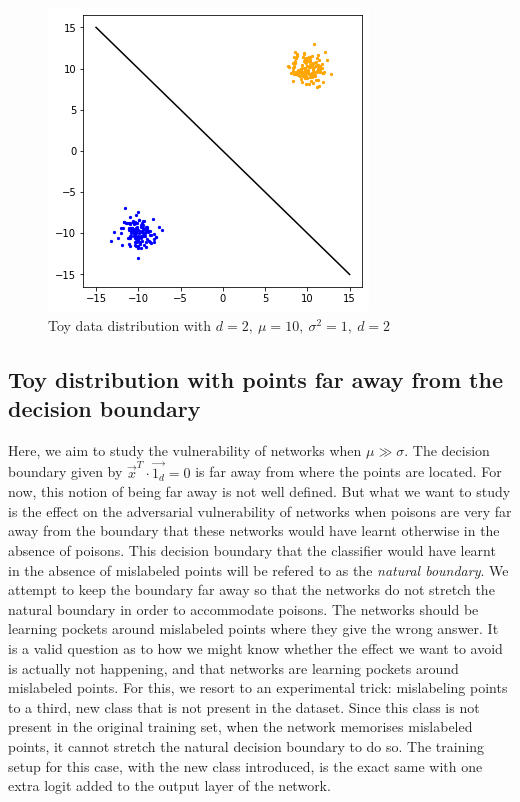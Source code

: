 \documentclass{ociamthesis}
\begin{document}
\begin{figure}[!h]
    \centering
    \includegraphics[scale=0.4]{sample_data}
    \caption{Toy data distribution with $d=2,~\mu=10,~\sigma^2=1,~d=2$}
    \label{fig:data_sample}
\end{figure}



\subsection{Toy distribution with points far away from the decision boundary}

Here, we aim to study the vulnerability of networks when $\mu \gg \sigma$. The
decision boundary given by $\vec{x}^T\cdot\vec{1_d} = 0$ is far away from where
the points are located. For now, this notion of being far away is not well
defined. But what we want to study is the effect on the adversarial
vulnerability of networks when poisons are very far away from the boundary that
these networks would have learnt otherwise in the absence of poisons. This
decision boundary that the classifier would have learnt in the absence of
mislabeled points will be refered to as the \emph{natural boundary}. We attempt
to keep the boundary far away so that the networks do not stretch the natural
boundary in order to accommodate poisons. The networks should be learning
pockets around mislabeled points where they give the wrong answer. It is a valid
question as to how we might know whether the effect we want to avoid is actually
not happening, and that networks are learning pockets around mislabeled points.
For this, we resort to an experimental trick: mislabeling points to a third, new
class that is not present in the dataset. Since this class is not present in the
original training set, when the network memorises mislabeled points, it cannot
stretch the natural decision boundary to do so. The training setup for this
case, with the new class introduced, is the exact same with one extra logit
added to the output layer of the network.
\end{document}
